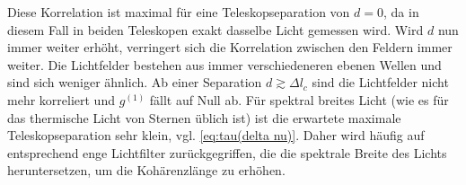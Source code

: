 Diese Korrelation ist maximal für eine Teleskopseparation von $d=0$, da in diesem Fall in beiden Teleskopen exakt dasselbe Licht gemessen wird. 
Wird $d$ nun immer weiter erhöht, verringert sich die Korrelation zwischen den Feldern immer weiter. 
Die Lichtfelder bestehen aus immer verschiedeneren ebenen Wellen und sind sich weniger ähnlich. 
Ab einer Separation $d\gtrsim\Delta l_c$ sind die Lichtfelder nicht mehr korreliert und $g^{(1)}$ fällt auf Null ab. 
Für spektral breites Licht (wie es für das thermische Licht von Sternen üblich ist) ist die erwartete maximale Teleskopseparation sehr klein, vgl. \autoref{eq:tau(delta nu)}. 
Daher wird häufig auf entsprechend enge Lichtfilter zurückgegriffen, die die spektrale Breite des Lichts heruntersetzen, um die Kohärenzlänge zu erhöhen. \\


